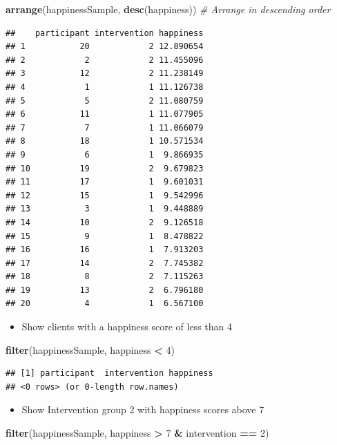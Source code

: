 \documentclass[
]{book}
\newenvironment{Shaded}{\begin{snugshade}}{\end{snugshade}}
\newcommand{\CommentTok}[1]{\textcolor[rgb]{0.56,0.35,0.01}{\textit{#1}}}
\newcommand{\DecValTok}[1]{\textcolor[rgb]{0.00,0.00,0.81}{#1}}
\newcommand{\KeywordTok}[1]{\textcolor[rgb]{0.13,0.29,0.53}{\textbf{#1}}}
\newcommand{\NormalTok}[1]{#1}
\newcommand{\OperatorTok}[1]{\textcolor[rgb]{0.81,0.36,0.00}{\textbf{#1}}}
\newcommand{\StringTok}[1]{\textcolor[rgb]{0.31,0.60,0.02}{#1}}
\providecommand{\tightlist}{%
  \setlength{\itemsep}{0pt}\setlength{\parskip}{0pt}}
\begin{document}
\begin{Shaded}
\begin{Highlighting}[]
\KeywordTok{arrange}\NormalTok{(happinessSample, }\KeywordTok{desc}\NormalTok{(happiness)) }\CommentTok{# Arrange in descending order}
\end{Highlighting}
\end{Shaded}

\begin{verbatim}
##    participant intervention happiness
## 1           20            2 12.890654
## 2            2            2 11.455096
## 3           12            2 11.238149
## 4            1            1 11.126738
## 5            5            2 11.080759
## 6           11            1 11.077905
## 7            7            1 11.066079
## 8           18            1 10.571534
## 9            6            1  9.866935
## 10          19            2  9.679823
## 11          17            1  9.601031
## 12          15            1  9.542996
## 13           3            1  9.448889
## 14          10            2  9.126518
## 15           9            1  8.478822
## 16          16            1  7.913203
## 17          14            2  7.745382
## 18           8            2  7.115263
## 19          13            2  6.796180
## 20           4            1  6.567100
\end{verbatim}

\begin{itemize}
\tightlist
\item
  Show clients with a happiness score of less than 4
\end{itemize}

\begin{Shaded}
\begin{Highlighting}[]
\KeywordTok{filter}\NormalTok{(happinessSample, happiness }\OperatorTok{<}\StringTok{ }\DecValTok{4}\NormalTok{)}
\end{Highlighting}
\end{Shaded}

\begin{verbatim}
## [1] participant  intervention happiness   
## <0 rows> (or 0-length row.names)
\end{verbatim}

\begin{itemize}
\tightlist
\item
  Show Intervention group 2 with happiness scores above 7
\end{itemize}

\begin{Shaded}
\begin{Highlighting}[]
\KeywordTok{filter}\NormalTok{(happinessSample, happiness }\OperatorTok{>}\StringTok{ }\DecValTok{7} \OperatorTok{&}\StringTok{ }\NormalTok{intervention }\OperatorTok{==}\StringTok{ }\DecValTok{2}\NormalTok{)}
\end{Highlighting}
\end{Shaded}
\end{document}
